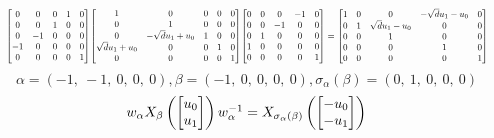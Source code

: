 \documentclass[11pt]{article}
\theoremstyle{definition}
\begin{document}
\[
\scaletoalign{\textwidth}{{\left[\begin{matrix}0 & 0 & 0 & 1 & 0\\0 & 0 & 1 & 0 & 0\\0 & -1 & 0 & 0 & 0\\-1 & 0 & 0 & 0 & 0\\0 & 0 & 0 & 0 & 1\end{matrix}\right]} {\left[\begin{matrix}1 & 0 & 0 & 0 & 0\\0 & 1 & 0 & 0 & 0\\0 & - \sqrt{d} u_{1} + u_{0} & 1 & 0 & 0\\\sqrt{d} u_{1} + u_{0} & 0 & 0 & 1 & 0\\0 & 0 & 0 & 0 & 1\end{matrix}\right]} {\left[\begin{matrix}0 & 0 & 0 & -1 & 0\\0 & 0 & -1 & 0 & 0\\0 & 1 & 0 & 0 & 0\\1 & 0 & 0 & 0 & 0\\0 & 0 & 0 & 0 & 1\end{matrix}\right]} = {\left[\begin{matrix}1 & 0 & 0 & - \sqrt{d} u_{1} - u_{0} & 0\\0 & 1 & \sqrt{d} u_{1} - u_{0} & 0 & 0\\0 & 0 & 1 & 0 & 0\\0 & 0 & 0 & 1 & 0\\0 & 0 & 0 & 0 & 1\end{matrix}\right]}}
\]
\[
\alpha = \left( -1, \  -1, \  0, \  0, \  0\right), \beta = \left( -1, \  0, \  0, \  0, \  0\right), \sigma_{\alpha}(\beta) = \left( 0, \  1, \  0, \  0, \  0\right)
\]
\[
\scaletoalign{\textwidth}{w_{\alpha} X_{\beta}\left(\left[\begin{matrix}u_{0}\\u_{1}\end{matrix}\right]\right) w_{\alpha}^{-1} = X_{\sigma_{\alpha}\left(\beta\right)}\left(\left[\begin{matrix}- u_{0}\\- u_{1}\end{matrix}\right]\right)}
\]
\end{document}

